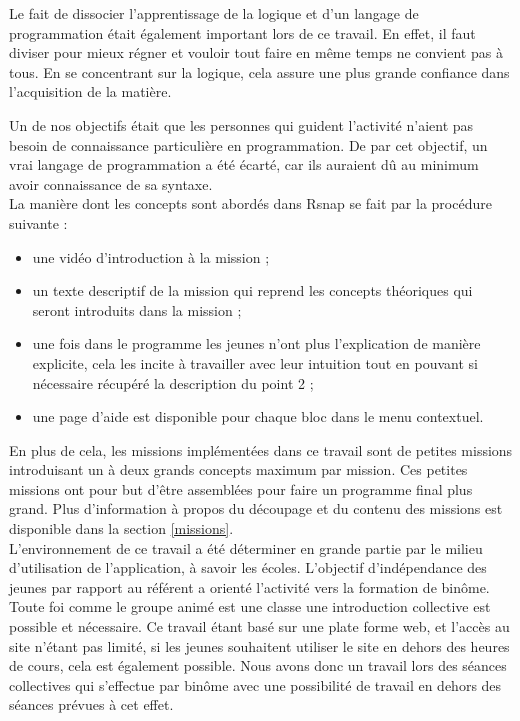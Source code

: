 Le fait de dissocier l'apprentissage de la logique et d'un langage de programmation était également important lors de ce travail. En effet, il faut diviser pour mieux régner et vouloir tout faire en même temps ne convient pas à tous. En se concentrant sur la logique, cela assure une plus grande confiance dans l'acquisition de la matière.

Un de nos objectifs était que les personnes qui guident l'activité n'aient pas besoin de connaissance particulière en programmation. De par cet objectif, un vrai langage de programmation a été écarté, car ils auraient dû au minimum avoir connaissance de sa syntaxe.\\

La manière dont les concepts sont abordés dans \gls{Rsnap} se fait par la procédure suivante :
\begin{itemize}
	\item une vidéo d'introduction à la mission ;
	\item un texte descriptif de la mission qui reprend les concepts théoriques qui seront introduits dans la mission ;
	\item une fois dans le programme les jeunes n'ont plus l'explication de manière explicite, cela les incite à travailler avec leur intuition tout en pouvant si nécessaire récupéré la description du point 2 ;
	\item une page d'aide est disponible pour chaque bloc dans le menu contextuel.
\end{itemize}

En plus de cela, les missions implémentées dans ce travail sont de petites missions introduisant un à deux grands concepts maximum par mission. Ces petites missions ont pour but d'être assemblées pour faire un programme final plus grand. Plus d'information à propos du découpage et du contenu des missions est disponible dans la section \ref{missions}.\\

L'environnement de ce travail a été déterminer en grande partie par le milieu d'utilisation de l'application, à savoir les écoles. L'objectif d'indépendance des jeunes par rapport au référent a orienté l'activité vers la formation de binôme. Toute foi comme le groupe animé est une classe une introduction collective est possible et nécessaire. Ce travail étant basé sur une plate forme web, et l'accès au site n'étant pas limité, si les jeunes souhaitent utiliser le site en dehors des heures de cours, cela est également possible.
Nous avons donc un travail lors des séances collectives qui s'effectue par binôme avec une possibilité de travail en dehors des séances prévues à cet effet.


